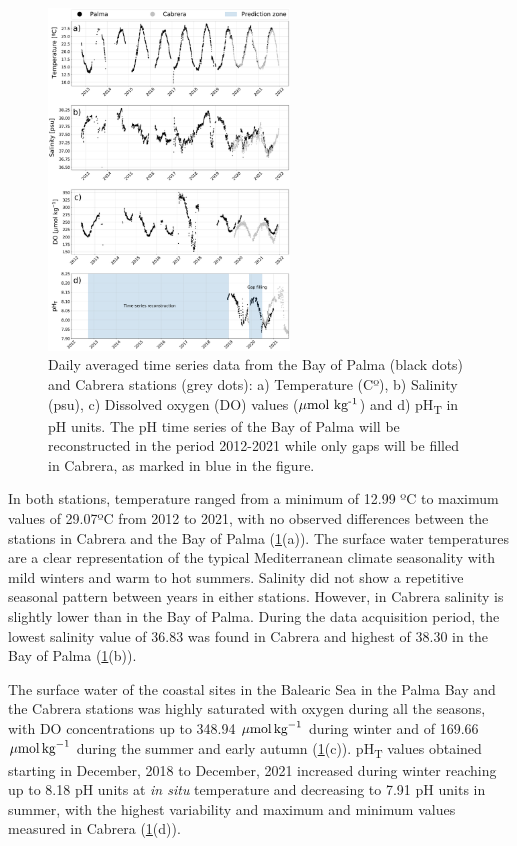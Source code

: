 \begin{figure}[H]
    \centering
    \includegraphics[width=0.57\textwidth]{Figures/Data_study.pdf}
    \caption[Daily averaged time series data from the Bay of Palma and Cabrera
        stations]{Daily averaged time series data from the Bay of Palma (black
        dots)
        and Cabrera stations (grey dots): a) Temperature (Cº), b) Salinity
        (psu), c)
        Dissolved oxygen (DO) values (${\mu\textrm{mol
                        kg}\textsuperscript{-1}}$) and
        d) pH\textsubscript{T} in pH units. The pH time series of the Bay of
        Palma will
        be reconstructed in the period 2012-2021 while only gaps will be filled
        in
        Cabrera, as marked in blue in the figure.}
    \label{fig:data}
\end{figure}

In both stations, temperature ranged from a minimum of 12.99 ºC to maximum
values of 29.07ºC from 2012 to 2021, with no observed differences between the
stations in Cabrera and the Bay of Palma (\cref{fig:data}(a)). The surface
water temperatures are a clear representation of the typical Mediterranean
climate seasonality with mild winters and warm to hot summers. Salinity did not
show a repetitive seasonal pattern between years in either stations. However,
in Cabrera salinity is slightly lower than in the Bay of Palma. During the data
acquisition period, the lowest salinity value of 36.83 was found in Cabrera and
highest of 38.30 in the Bay of Palma (\cref{fig:data}(b)).

The surface water of the coastal sites in the Balearic Sea in the Palma Bay
and the Cabrera stations was highly saturated with oxygen during all the
seasons, with DO concentrations up to  348.94 ${\mu \textrm{mol\,kg}^{-1}}$
during winter and of 169.66 ${\mu \textrm{mol\,kg}^{-1}}$ during the summer and
early autumn (\cref{fig:data}(c)). pH\textsubscript{T} values obtained starting
in December, 2018 to December, 2021 increased during winter reaching up to 8.18
pH units at \emph{in situ} temperature and decreasing to 7.91 pH units in
summer, with the highest variability and maximum and minimum values measured in
Cabrera (\cref{fig:data}(d)).

